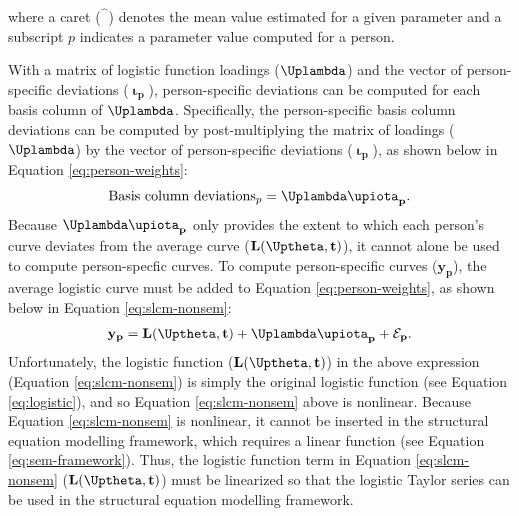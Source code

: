 \documentclass[
12pt, %
twoside,
english]{guelphthesis}
\begin{document}
\noindent where a caret (\(\hat{\phantom{\beta}}\)) denotes the mean value estimated
for a given parameter and a subscript \(p\) indicates a parameter value
computed for a person.

With a matrix of logistic function loadings (\(\mathbf{\Uplambda}\)) and the vector of person-specific deviations (\(\mathbf{\upiota_p}\)), person-specific deviations can be computed for each basis column of \(\mathbf{\Uplambda}\). Specifically, the person-specific basis column deviations can be computed by post-multiplying the matrix of loadings (\(\mathbf{\Uplambda}\)) by the vector of person-specific deviations (\(\mathbf{\upiota_p}\)), as shown below in Equation \ref{eq:person-weights}:
\begin{align}
 \text{Basis column deviations}_p = \mathbf{\Uplambda\upiota_p}.
 \label{eq:person-weights}
\end{align}
\noindent Because \(\mathbf{\Uplambda\upiota_p}\) only provides the extent to which each person's curve deviates from the average curve (\(\mathbf{L(\Uptheta, t)}\)), it cannot alone be used to compute person-specfic curves. To compute person-specific curves (\(\mathbf{y_p}\)), the average logistic curve must be added to Equation \ref{eq:person-weights}, as shown below in Equation \ref{eq:slcm-nonsem}:
\begin{align}
 \mathbf{y_p} = \mathbf{L(\Uptheta, t)} + \mathbf{\Uplambda\upiota_p} + \mathbf{\mathcal{E}_p}.
 \label{eq:slcm-nonsem}
\end{align}
\noindent Unfortunately, the logistic function (\(\mathbf{L(\Uptheta, t)}\)) in the above expression (Equation \ref{eq:slcm-nonsem}) is simply the original logistic function (see Equation \ref{eq:logistic}), and so Equation \ref{eq:slcm-nonsem} above is nonlinear. Because Equation \ref{eq:slcm-nonsem} is nonlinear, it cannot be inserted in the structural equation modelling framework, which requires a linear function (see Equation \ref{eq:sem-framework}). Thus, the logistic function term in Equation \ref{eq:slcm-nonsem} (\(\mathbf{L(\Uptheta, t)}\)) must be linearized so that the logistic Taylor series can be used in the structural equation modelling framework.
\end{document}
